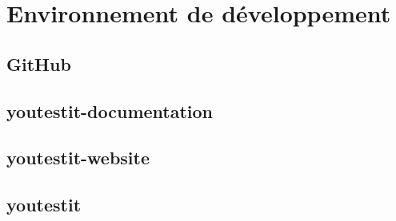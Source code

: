 \newpage{}
\chapter{Environnement de développement}

\section{GitHub}


\section{youtestit-documentation}


\section{youtestit-website}	


\section{youtestit}


